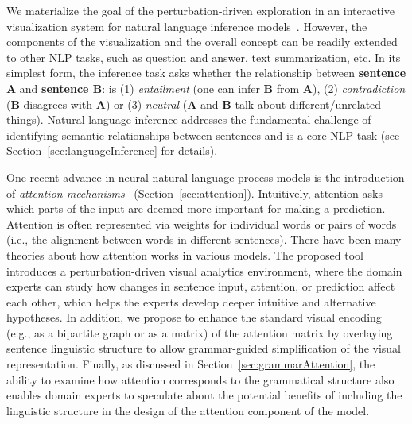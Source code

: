We materialize the goal of the perturbation-driven exploration in an interactive visualization system for natural language inference models~\cite{Parikh2016}.
However, the components of the visualization and the overall concept can be readily extended to other NLP tasks, such as question and answer, text summarization, etc.
%
In its simplest form, the inference task asks whether the
relationship between \textbf{sentence A} and \textbf{sentence B}: is (1) \emph{entailment} (one can infer \textbf{B} from \textbf{A}), (2) \emph{contradiction} (\textbf{B} disagrees with \textbf{A}) or (3) \emph{neutral} (\textbf{A} and \textbf{B} talk about different/unrelated things).
Natural language inference addresses the fundamental challenge of identifying semantic relationships between sentences and is a core NLP task (see Section~\ref{sec:languageInference} for details).

One recent advance in neural natural language process models is the
introduction of \emph{attention
  mechanisms}~\cite{bahdanau2014neural,VaswaniShazeerParmar2017}
(Section~\ref{sec:attention}). Intuitively, attention asks which parts of the
input are deemed more important for making a prediction. Attention is often represented via weights for individual words or pairs of words (i.e., the alignment between words in different sentences).
%
There have been many theories about how attention works in various models.
The proposed tool introduces a perturbation-driven visual analytics environment, where the domain experts can study how changes in sentence input, attention, or prediction affect each other, which helps the experts develop deeper intuitive and alternative hypotheses.
In addition, we propose to enhance the standard visual encoding (e.g., as a bipartite graph or as a matrix) of the attention matrix by overlaying sentence linguistic structure to allow grammar-guided simplification of the visual representation.
%
Finally, as discussed in Section~\ref{sec:grammarAttention}, the ability to examine how attention corresponds to the grammatical structure also enables domain experts to speculate about the potential benefits of including the linguistic structure in the design of the attention component of the model.

